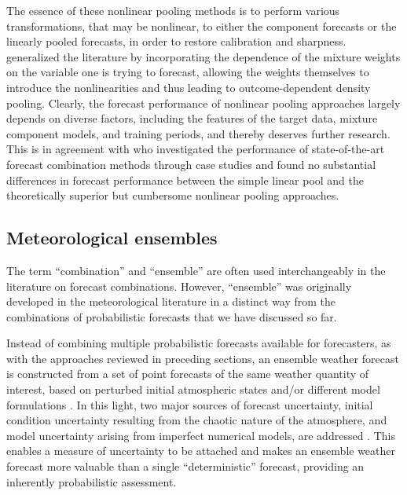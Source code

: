 \documentclass[a4paper,11pt]{article}
\begin{document}
The essence of these nonlinear pooling methods is to perform various transformations, that may be nonlinear, to either the component forecasts or the linearly pooled forecasts, in order to restore calibration and sharpness. \citet{Kapetanios2015-bb} generalized the literature by incorporating the dependence of the mixture weights on the variable one is trying to forecast, allowing the weights themselves to introduce the nonlinearities and thus leading to outcome-dependent density pooling. Clearly, the forecast performance of nonlinear pooling approaches largely depends on diverse factors, including the features of the target data, mixture component models, and training periods, and thereby deserves further research. This is in agreement with \citet{Baran2018-nm} who investigated the performance of state-of-the-art forecast combination methods through case studies and found no substantial differences in forecast performance between the simple linear pool and the theoretically superior but cumbersome nonlinear pooling approaches.

\subsection{Meteorological ensembles}
\label{sec:weather}

The term ``combination'' and ``ensemble'' are often used interchangeably in the literature on forecast combinations. However, ``ensemble'' was originally developed in the meteorological literature in a distinct way from the combinations of probabilistic forecasts that we have discussed so far.

Instead of combining multiple probabilistic forecasts available for forecasters, as with the approaches reviewed in preceding sections, an ensemble weather forecast is constructed from a set of point forecasts of the same weather quantity of interest, based on perturbed initial atmospheric states \citep[e.g.,][]{Maqsood2004-pe,Gneiting2005-yn} and/or different model formulations \citep[e.g.,][]{Buizza1999-st,Buizza2005-wf}. In this light, two major sources of forecast uncertainty, initial condition uncertainty resulting from the chaotic nature of the atmosphere, and model uncertainty arising from imperfect numerical models, are addressed \citep{Lorenz1963-yn,Weigel2008-vy,Baran2014-tm}. This enables a measure of uncertainty to be attached and makes an ensemble weather forecast more valuable than a single ``deterministic'' forecast, providing an inherently probabilistic assessment.
\end{document}
